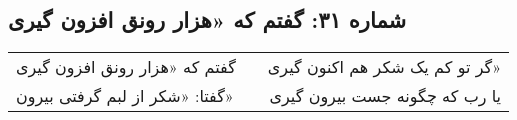 \begin{center}
\section*{شماره ۳۱: گفتم که «هزار رونق افزون گیری}
\label{sec:031}
\begin{longtable}{l p{0.5cm} r}
گفتم که «هزار رونق افزون گیری
&&
گر تو کم یک شکر هم اکنون گیری»
\\
گفتا: «شکر از لبم گرفتی بیرون»
&&
یا رب که چگونه جست بیرون گیری
\\
\end{longtable}
\end{center}
